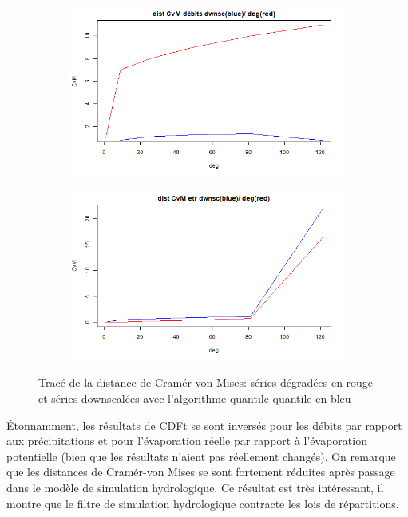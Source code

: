 \documentclass[a4paper,11pt]{article}
\numberwithin{equation}{section}
\begin{document}
\begin{figure}[H]
	\label{fig-res_CVM_deb_CDFt}
	\centering
	\begin{subfigure}[b]{0.45\textwidth}
		\includegraphics[scale=0.4]{images/Dist_CVM_CDFt_deb.png}
	\end{subfigure}
	\hfill
	\begin{subfigure}[b]{0.45\textwidth}
		\includegraphics[scale=0.4]{images/Dist_CVM_CDFt_etr.png}
	\end{subfigure}
	\caption{Tracé de la distance de Cramér-von Mises: séries dégradées en rouge et séries downscalées avec l'algorithme quantile-quantile en bleu}
\end{figure}

Étonnamment, les résultats de CDFt se sont inversés pour les débits par rapport aux précipitations et pour l'évaporation réelle par rapport à l'évaporation potentielle (bien que les résultats n'aient pas réellement changés). On remarque que les distances de Cramér-von Mises se sont fortement réduites après passage dans le modèle de simulation hydrologique. Ce résultat est très intéressant, il montre que le filtre de simulation hydrologique contracte les lois de répartitions. 
\end{document}
